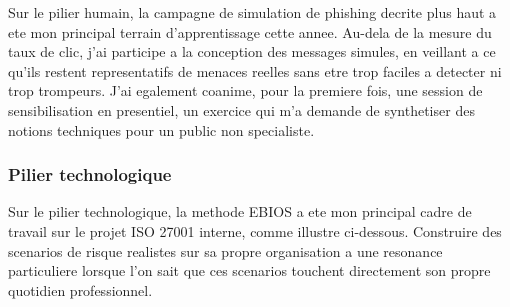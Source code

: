 \documentclass[11pt,a4paper]{article}
\begin{document}
Sur le pilier humain, la campagne de simulation de phishing decrite plus haut a ete mon principal terrain d'apprentissage cette annee. Au-dela de la mesure du taux de clic, j'ai participe a la conception des messages simules, en veillant a ce qu'ils restent representatifs de menaces reelles sans etre trop faciles a detecter ni trop trompeurs. J'ai egalement coanime, pour la premiere fois, une session de sensibilisation en presentiel, un exercice qui m'a demande de synthetiser des notions techniques pour un public non specialiste.

\subsubsection*{Pilier technologique}

Sur le pilier technologique, la methode EBIOS a ete mon principal cadre de travail sur le projet ISO 27001 interne, comme illustre ci-dessous. Construire des scenarios de risque realistes sur sa propre organisation a une resonance particuliere lorsque l'on sait que ces scenarios touchent directement son propre quotidien professionnel.

\begin{center}
\end{center}
\end{document}
